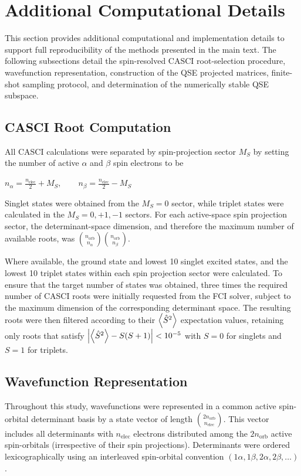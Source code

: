 \section{Additional Computational Details}
\label{sec:si-methods}
This section provides additional computational and implementation details to support full reproducibility of the methods presented in the main text. 
The following subsections detail the spin-resolved CASCI root-selection procedure, wavefunction representation, construction of the QSE projected matrices, finite-shot sampling protocol, and determination of the numerically stable QSE subspace.

\subsection{CASCI Root Computation}
\label{sec:si-casci-root-computation}
All CASCI calculations were separated by spin-projection sector $M_S$ by setting the number of active $\alpha$ and $\beta$ spin electrons to be 

$n_{\alpha} = \frac{n_{\mathrm{elec}}}{2} + M_S, \qquad n_{\beta} = \frac{n_{\mathrm{elec}}}{2} - M_S$

Singlet states were obtained from the $M_S=0$ sector, while triplet states were calculated in the $M_S=0, +1, -1$ sectors. For each active-space spin projection sector, the determinant-space dimension, and therefore the maximum number of available roots, was $\binom{n_{\mathrm{orb}}}{n_{\alpha}} \binom{n_{\mathrm{orb}}}{n_{\beta}}$. 

Where available, the ground state and lowest 10 singlet excited states, and the lowest 10 triplet states within each spin projection sector were calculated. To ensure that the target number of states was obtained, three times the required number of CASCI roots were initially requested from the FCI solver, subject to the maximum dimension of the corresponding determinant space. 
The resulting roots were then filtered according to their $\left\langle \hat{S}^2 \right\rangle$ expectation values, retaining only roots that satisfy $\left| \left\langle \hat{S}^2 \right\rangle - S(S+1) \right| < 10^{-5}$ with $S=0$ for singlets and $S=1$ for triplets. 


\subsection{Wavefunction Representation}
\label{sec:si-wavefunction-representation}
Throughout this study, wavefunctions were represented in a common active spin-orbital determinant basis by a state vector of length $\binom{2 n_{\mathrm{orb}}}{n_{\mathrm{elec}}}$. 
This vector includes all determinants with $n_{\mathrm{elec}}$ electrons distributed among the $2n_{\mathrm{orb}}$ active spin-orbitals (irrespective of their spin projections).
Determinants were ordered lexicographically using an interleaved spin-orbital convention $(1\alpha, 1\beta, 2\alpha, 2\beta, \ldots)$.

